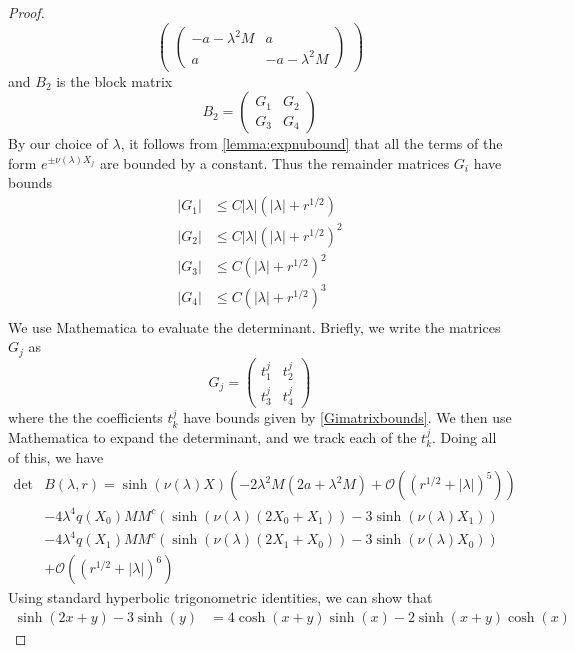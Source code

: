 \documentclass[thesis.tex]{subfiles}
\begin{document}
\begin{lemma}
\begin{proof}
\[\begin{pmatrix}
\begin{pmatrix}
-a - \lambda^2 M & a \\
a & -a - \lambda^2 M
\end{pmatrix}
\end{pmatrix}
\]
and $B_2$ is the block matrix 
\[
B_2 = \begin{pmatrix}
G_1 & G_2 \\ G_3 & G_4
\end{pmatrix}
\]
By our choice of $\lambda$, it follows from \cref{lemma:expnubound} that all the terms of the form $e^{\pm \nu(\lambda)X_j}$ are bounded by a constant. Thus the remainder matrices $G_i$ have bounds
\begin{equation}\label{Gimatrixbounds}
\begin{aligned}
|G_1| &\leq C |\lambda| (|\lambda| + r^{1/2} )\\
|G_2| &\leq C |\lambda| (|\lambda| + r^{1/2} )^2 \\
|G_3| &\leq C (|\lambda| + r^{1/2} )^2 \\
|G_4| &\leq C (|\lambda| + r^{1/2} )^3 \\
\end{aligned}
\end{equation}
We use Mathematica to evaluate the determinant. Briefly, we write the matrices $G_j$ as
\[
G_j = \begin{pmatrix}t^j_1 & t^j_2 \\ t^j_3 & t^j_4 \end{pmatrix}
\]
where the the coefficients $t^j_k$ have bounds given by \cref{Gimatrixbounds}. We then use Mathematica to expand the determinant, and we track each of the $t^j_k$. Doing all of this, we have
\begin{equation}\label{2detB1}
\begin{aligned}
\det &B(\lambda, r) = \sinh(\nu(\lambda)X)\left(-2 \lambda^2 M (2a + \lambda^2 M) +  \mathcal{O}( (r^{1/2} + |\lambda|)^5 )\right) \\
&-4\lambda^4 q(X_0) M M^c \left( \sinh(\nu(\lambda)(2 X_0 + X_1)) - 3 \sinh(\nu(\lambda)X_1)  \right) \\
&-4\lambda^4 q(X_1) M M^c \left( \sinh(\nu(\lambda)(2 X_1 + X_0)) - 3 \sinh(\nu(\lambda)X_0)  \right) \\
&+ \mathcal{O}( (r^{1/2} + |\lambda|)^6) 
\end{aligned}
\end{equation}
Using standard hyperbolic trigonometric identities, we can show that 
\begin{align*}
\sinh(2 x + y) - 3 \sinh(y) &= 4 \cosh(x + y)\sinh(x) 
-2 \sinh(x+y)\cosh(x) 

\end{align*}
\end{proof}
\end{lemma}
\end{document}
